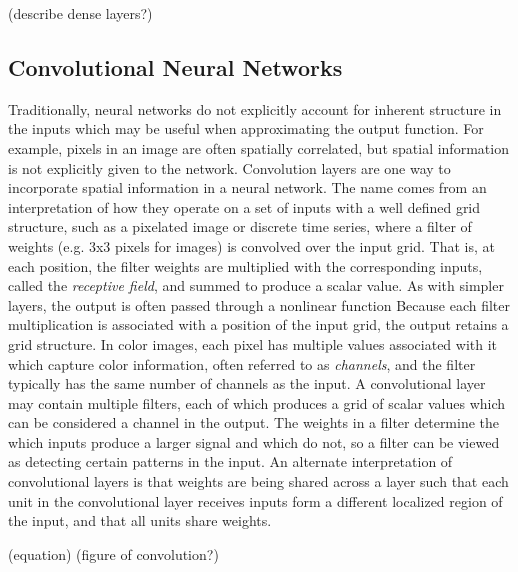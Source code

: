 (describe dense layers?)

\subsection{Convolutional Neural Networks}

Traditionally, neural networks do not explicitly account for inherent structure in the inputs which may be useful when approximating the output function.
For example, pixels in an image are often spatially correlated, but spatial information is not explicitly given to the network.
Convolution layers are one way to incorporate spatial information in a neural network. 
The name comes from an interpretation of how they operate on a set of inputs with a well defined grid structure, such as a pixelated image or discrete time series, where a filter of weights (e.g. 3x3 pixels for images) is convolved over the input grid.
That is, at each position, the filter weights are multiplied with the corresponding inputs, called the \textit{receptive field}, and summed to produce a scalar value.
As with simpler layers, the output is often passed through a nonlinear function
Because each filter multiplication is associated with a position of the input grid, the output retains a grid structure. 
In color images, each pixel has multiple values associated with it which capture color information, often referred to as \textit{channels}, and the filter typically has the same number of channels as the input. 
A convolutional layer may contain multiple filters, each of which produces a grid of scalar values which can be considered a channel in the output.
The weights in a filter determine the which inputs produce a larger signal and which do not, so a filter can be viewed as detecting certain patterns in the input.
An alternate interpretation of convolutional layers is that weights are being shared across a layer such that each unit in the convolutional layer receives inputs form a different localized region of the input, and that all units share weights. 

(equation)
(figure of convolution?)


